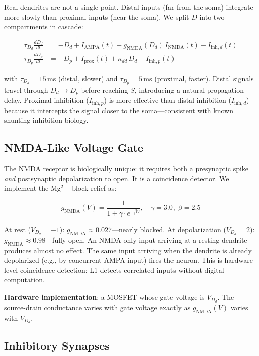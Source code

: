 \documentclass[12pt]{article}
\begin{document}
Real dendrites are not a single point. Distal inputs (far from the soma) integrate more slowly than proximal inputs (near the soma). We split $D$ into two compartments in cascade:

\begin{align}
\tau_{D_d} \frac{dD_d}{dt} &= -D_d + I_{\text{AMPA}}(t) + g_{\text{NMDA}}(D_d)\,I_{\text{NMDA}}(t) - I_{\text{inh},d}(t) \label{eq:Dd} \\
\tau_{D_p} \frac{dD_p}{dt} &= -D_p + I_{\text{prox}}(t) + \kappa_{dd}\,D_d - I_{\text{inh},p}(t) \label{eq:Dp}
\end{align}

\noindent with $\tau_{D_d} = 15$\,ms (distal, slower) and $\tau_{D_p} = 5$\,ms (proximal, faster). Distal signals travel through $D_d \to D_p$ before reaching $S$, introducing a natural propagation delay. Proximal inhibition ($I_{\text{inh},p}$) is more effective than distal inhibition ($I_{\text{inh},d}$) because it intercepts the signal closer to the soma---consistent with known shunting inhibition biology.

\subsection{NMDA-Like Voltage Gate}

The NMDA receptor is biologically unique: it requires both a presynaptic spike \textit{and} postsynaptic depolarization to open. It is a coincidence detector. We implement the Mg$^{2+}$ block relief as:

\[
g_{\text{NMDA}}(V) = \frac{1}{1 + \gamma \cdot e^{-\beta V}}, \quad \gamma = 3.0,\; \beta = 2.5
\]

At rest ($V_{D_d} = -1$): $g_{\text{NMDA}} \approx 0.027$---nearly blocked. At depolarization ($V_{D_d} = 2$): $g_{\text{NMDA}} \approx 0.98$---fully open. An NMDA-only input arriving at a resting dendrite produces almost no effect. The same input arriving when the dendrite is already depolarized (e.g., by concurrent AMPA input) fires the neuron. This is hardware-level coincidence detection: L1 detects correlated inputs without digital computation.

\textbf{Hardware implementation}: a MOSFET whose gate voltage is $V_{D_d}$. The source-drain conductance varies with gate voltage exactly as $g_{\text{NMDA}}(V)$ varies with $V_{D_d}$.

\subsection{Inhibitory Synapses}
\end{document}
